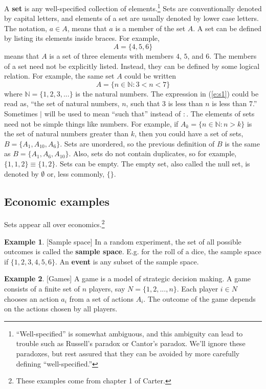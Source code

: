 \documentclass[12pt,reqno]{amsart}
\theoremstyle{definition}
\newtheorem{example}{Example}[section]
\begin{document}
A \textbf{set} is any well-specified collection of
elements.\footnote{``Well-specified'' is somewhat ambiguous, and this
  ambiguity can lead to trouble such as Russell's paradox or Cantor's
  paradox. We'll ignore these paradoxes, but rest assured that they
  can be avoided by more carefully defining ``well-specified.''
} Sets are conventionally denoted by capital letters, and
elements of a set are usually denoted by lower case letters. The
notation, $a \in A$, means that $a$ is a member of the set $A$. A set
can be defined by listing its elements inside braces. For example,
\[ A = \{ 4, 5, 6 \} \]
means that $A$ is a set of three elements with members $4$, $5$, and
$6$. The members of a set need not be explicitly listed. Instead, they
can be defined by some logical relation. For example, the same set $A$
could be written
\begin{equation}
  A = \{ n \in \mathbb{N} : 3 < n < 7 \}  \label{e:s1}
\end{equation}
where $\mathbb{N} = \{1, 2, 3, ... \}$ is the natural numbers. The
expression in (\ref{e:s1}) could be read as, ``the set of natural
numbers, $n$, such that 3 is less than $n$ is less than 7.''
Sometimes $|$ will be used to mean ``such that'' instead of $:$. The
elements of sets need not be simple things like numbers. For example,
if $A_k = \{ n \in \mathbb{N}: n > k \}$ is the set of natural numbers
greater than $k$, then you could have a set of sets, $B = \{ A_1,
A_{10}, A_{6} \}$.  Sets are unordered, so the previous definition of
$B$ is the same as $B = \{ A_1, A_6, A_{10} \}$. Also, sets do not
contain duplicates, so for example, $\{ 1, 1, 2 \} \equiv \{1, 2
\}$. Sets can be empty. The empty set, also called the null set, is
denoted by $\emptyset$ or, less commonly, $\{ \}$.

\subsection{Economic examples}

Sets appear all over economics.\footnote{These examples come
from chapter 1 of Carter.} 
\begin{example}\label{ex:sampleSpace}[Sample space]
  In a random experiment, the set of all possible outcomes is called
  the \textbf{sample space}. E.g. for the roll of a dice, the sample
  space if $\{1,2 ,3 , 4, 5, 6\}$. An \textbf{event} is any subset of
  the sample space.
\end{example}

\begin{example}\label{ex:games}[Games]
  A game is a model of strategic decision making. A game consists of a
  finite set of $n$ players, say $N = \{1,2,..., n\}$. Each player $i
  \in N$ chooses an action $a_i$ from a set of actions $A_i$. The
  outcome of the game depends on the actions chosen by all players. 
\end{example}
\end{document}
